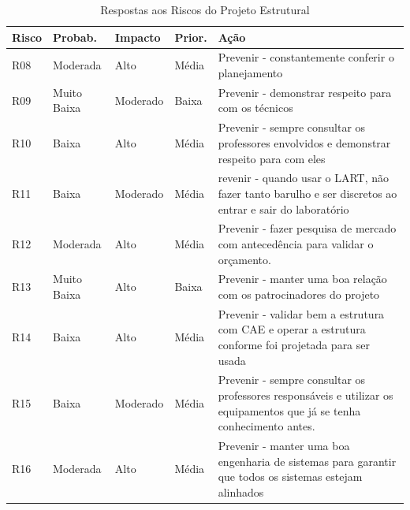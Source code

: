 \begin{table}[H]
\centering
\caption{Respostas aos Riscos do Projeto Estrutural }
\label{respostas-4}
\begin{tabular}{|l|l|l|l|p{9cm}|}
\hline
Risco & Probab.    & Impacto    & Prior. & Ação      \\
\hline
R08 & Moderada & Alto & Média & Prevenir - constantemente conferir o planejamento\\
R09 & Muito Baixa & Moderado & Baixa & Prevenir - demonstrar respeito para com os técnicos\\
R10 & Baixa & Alto & Média & Prevenir - sempre consultar os professores envolvidos e demonstrar respeito para com eles \\
R11 & Baixa & Moderado & Média & revenir - quando usar o LART, não fazer tanto barulho e ser discretos ao entrar e sair do laboratório \\
R12 & Moderada & Alto & Média & Prevenir - fazer pesquisa de mercado com antecedência para validar o orçamento.\\
R13 & Muito Baixa & Alto & Baixa & Prevenir - manter uma boa relação com os patrocinadores do projeto\\
R14 & Baixa & Alto & Média & Prevenir - validar bem a estrutura com CAE e operar a estrutura conforme foi projetada para ser usada \\
R15 & Baixa & Moderado & Média & Prevenir - sempre consultar os professores responsáveis e utilizar os equipamentos que já se tenha conhecimento antes. \\
R16 & Moderada & Alto & Média & Prevenir - manter uma boa engenharia de sistemas para garantir que todos os sistemas estejam alinhados \\
\hline
\end{tabular}
\end{table}




